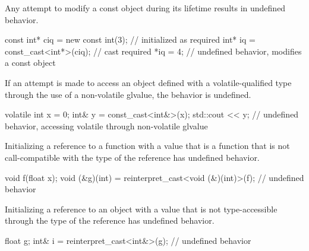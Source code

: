 \pnum
Any attempt to modify a const object during its lifetime results in
undefined behavior.

\pnum
\begin{example}
\begin{codeblock}
const int* ciq = new const int(3);  // initialized as required
int* iq = const_cast<int*>(ciq);    // cast required
*iq = 4;                            // undefined behavior, modifies a const object
\end{codeblock}
\end{example}


\pnum
If an attempt is made to access an object
defined with a volatile-qualified type
through the use of a non-volatile glvalue,
the behavior is undefined.

\pnum
\begin{example}
\begin{codeblock}
volatile int x = 0;
int& y = const_cast<int&>(x);
std::cout << y;         // undefined behavior, accessing volatile through non-volatile glvalue
\end{codeblock}
\end{example}


\pnum
Initializing a reference to a function
with a value that is a function
that is not call-compatible
with the type of the reference
has undefined behavior.

\pnum
\begin{example}
\begin{codeblock}
void f(float x);
void (&g)(int) = reinterpret_cast<void (&)(int)>(f);    // undefined behavior
\end{codeblock}
\end{example}


\pnum
Initializing a reference to an object
with a value that is not
type-accessible through
the type of the reference
has undefined behavior.

\pnum
\begin{example}
\begin{codeblock}
float g;
int& i = reinterpret_cast<int&>(g);     // undefined behavior
\end{codeblock}
\end{example}

